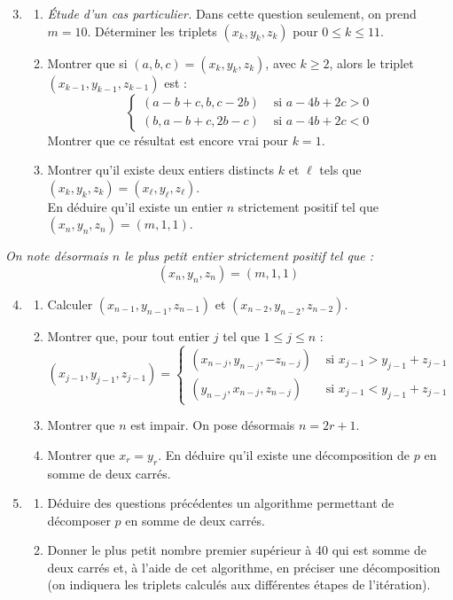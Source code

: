 \documentclass[landscape,twocolumn,leqno,a4paper,10pt]{report} %
\newcommand\n{\noindent}
\renewcommand{\geq}{\geqslant}
\renewcommand{\leq}{\leqslant}
\begin{document}
\begin{enumerate}\setcounter{enumi}{2}
	\item \begin{enumerate}
		\item \textit{Étude d'un cas particulier.} Dans cette question seulement, on prend $m=10$. Déterminer les triplets $\left(x_{k}, y_{k}, z_{k}\right)$ pour $0 \leq k \leq 11$.
		\item Montrer que si $(a, b, c)=\left(x_{k}, y_{k}, z_{k}\right)$, avec $k \geq 2$, alors le triplet $\left(x_{k-1}, y_{k-1}, z_{k-1}\right)$ est :
		$$\left\{\begin{array}{ll}
(a-b+c, b, c-2 b) & \text { si } a-4 b+2 c>0 \\
(b, a-b+c, 2 b-c) & \text { si } a-4 b+2 c<0
\end{array}\right.$$
		Montrer que ce résultat est encore vrai pour $k=1$.
		\item Montrer qu'il existe deux entiers distincts $k$ et $\ell$ tels que $\left(x_{k}, y_{k}, z_{k}\right)=\left(x_{\ell}, y_{\ell}, z_{\ell}\right)$.\\
		En déduire qu'il existe un entier $n$ strictement positif tel que $\left(x_{n}, y_{n}, z_{n}\right)=(m, 1,1)$.
	\end{enumerate}
\end{enumerate}

\n \textit{On note désormais $n$ le plus petit entier strictement positif tel que :}
$$\left(x_{n}, y_{n}, z_{n}\right)=(m, 1,1)$$

\begin{enumerate}\setcounter{enumi}{3}	
	\item \begin{enumerate}
		\item Calculer $\left(x_{n-1}, y_{n-1}, z_{n-1}\right)$ et $\left(x_{n-2}, y_{n-2}, z_{n-2}\right)$.
		\item Montrer que, pour tout entier $j$ tel que $1 \leq j \leq n$ :
		$$\left(x_{j-1}, y_{j-1}, z_{j-1}\right)=\left\{\begin{array}{ll}
\left(x_{n-j}, y_{n-j},-z_{n-j}\right) & \text { si } x_{j-1}>y_{j-1}+z_{j-1} \\
\left(y_{n-j}, x_{n-j}, z_{n-j}\right) & \text { si } x_{j-1}<y_{j-1}+z_{j-1}
\end{array}\right.$$
		\item Montrer que $n$ est impair. On pose désormais $n=2 r+1$.
		\item Montrer que $x_{r}=y_{r}$. En déduire qu'il existe une décomposition de $p$ en somme de deux carrés.
	\end{enumerate}
	\item \begin{enumerate}
		\item Déduire des questions précédentes un algorithme permettant de décomposer $p$ en somme de deux carrés.
		\item Donner le plus petit nombre premier supérieur à 40 qui est somme de deux carrés et, à l'aide de cet algorithme, en préciser une décomposition (on indiquera les triplets calculés aux différentes étapes de l'itération).
	\end{enumerate}
\end{enumerate}
\end{document}
